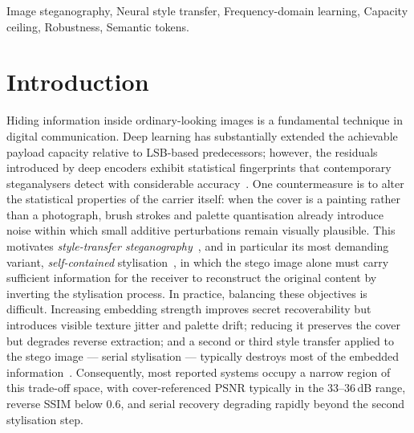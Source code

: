 \documentclass[conference]{IEEEtran}
\begin{document}
\begin{IEEEkeywords}
Image steganography, Neural style transfer, Frequency-domain learning, Capacity ceiling, Robustness, Semantic tokens.
\end{IEEEkeywords}

\section{Introduction}

Hiding information inside ordinary-looking images is a fundamental technique in digital communication. Deep learning has substantially extended the achievable payload capacity relative to LSB-based predecessors; however, the residuals introduced by deep encoders exhibit statistical fingerprints that contemporary steganalysers detect with considerable accuracy~\cite{isn,riis}. One countermeasure is to alter the statistical properties of the carrier itself: when the cover is a painting rather than a photograph, brush strokes and palette quantisation already introduce noise within which small additive perturbations remain visually plausible. This motivates \emph{style-transfer steganography}~\cite{wacv2020,ihst2024,sddpm2025}, and in particular its most demanding variant, \emph{self-contained} stylisation~\cite{wacv2020}, in which the stego image alone must carry sufficient information for the receiver to reconstruct the original content by inverting the stylisation process. In practice, balancing these objectives is difficult. Increasing embedding strength improves secret recoverability but introduces visible texture jitter and palette drift; reducing it preserves the cover but degrades reverse extraction; and a second or third style transfer applied to the stego image --- serial stylisation --- typically destroys most of the embedded information~\cite{wacv2020}. Consequently, most reported systems occupy a narrow region of this trade-off space, with cover-referenced PSNR typically in the $33$--$36$\,dB range, reverse SSIM below $0.6$, and serial recovery degrading rapidly beyond the second stylisation step.
\end{document}
